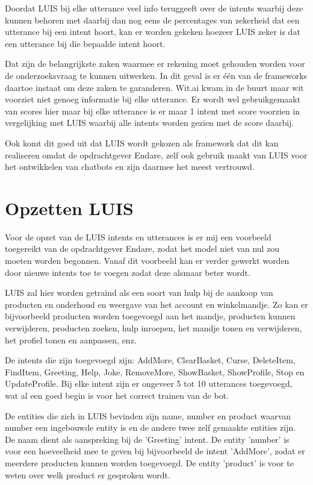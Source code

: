 Doordat LUIS bij elke utterance veel info teruggeeft over de intents waarbij deze kunnen behoren met daarbij dan nog eens de percentages van zekerheid dat een utterance bij een intent hoort, kan er worden gekeken hoezeer LUIS zeker is dat een utterance bij die bepaalde intent hoort.

Dat zijn de belangrijkste zaken waarmee er rekening moet gehouden worden voor de onderzoeksvraag te kunnen uitwerken. In dit geval is er één van de frameworks daartoe instaat om deze zaken te garanderen. Wit.ai kwam in de buurt maar wit voorziet niet genoeg informatie bij elke utterance. Er wordt wel gebruikgemaakt van scores hier maar bij elke utterance is er maar 1 intent met score voorzien in vergelijking met LUIS waarbij alle intents worden gezien met de score daarbij.

Ook komt dit goed uit dat LUIS wordt gekozen als framework dat dit kan realiseren omdat de opdrachtgever Endare, zelf ook gebruik maakt van LUIS voor het ontwikkelen van chatbots en zijn daarmee het meest vertrouwd.

\section{Opzetten LUIS}
\label{sec:opzet}

Voor de opzet van de LUIS intents en utterances is er mij een voorbeeld toegereikt van de opdrachtgever Endare, zodat het model niet van nul zou moeten worden begonnen. Vanaf dit voorbeeld kan er verder gewerkt worden door nieuwe intents toe te voegen zodat deze alsmaar beter wordt.

LUIS zal hier worden getraind als een soort van hulp bij de aankoop van producten en onderhoud en weergave van het account en winkelmandje. Zo kan er bijvoorbeeld producten worden toegevoegd aan het mandje, producten kunnen verwijderen, producten zoeken, hulp inroepen, het mandje tonen en verwijderen, het profiel tonen en aanpassen, enz.

De intents die zijn toegevoegd zijn: AddMore, ClearBasket, Curse, DeleteItem, FindItem, Greeting, Help, Joke, RemoveMore, ShowBasket, ShowProfile, Stop en UpdateProfile. Bij elke intent zijn er ongeveer 5 tot 10 utterances toegevoegd, wat al een goed begin is voor het correct trainen van de bot.

De entities die zich in LUIS bevinden zijn name, number en product waarvan number een ingebouwde entity is en de andere twee zelf gemaakte entities zijn. De naam dient als aanspreking bij de 'Greeting' intent. De entity 'number' is voor een hoeveelheid mee te geven bij bijvoorbeeld de intent 'AddMore', zodat er meerdere producten kunnen worden toegevoegd. De entity 'product' is voor te weten over welk product er gesproken wordt.

